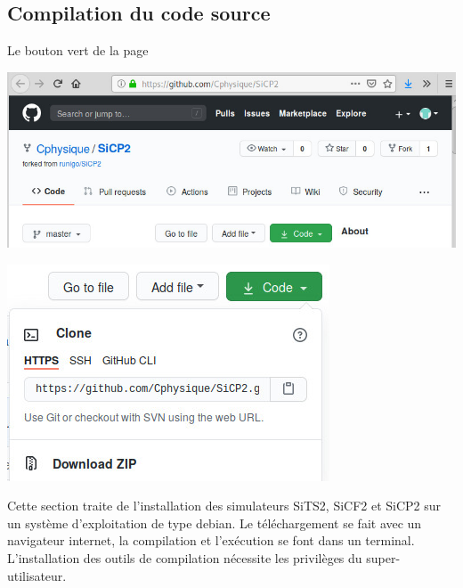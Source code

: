 \subsection{Compilation du code source}
%
Le bouton vert de la page 
%
\begin{center}
\includegraphics[width=.9\textwidth]{./presentation/CphysiqueSiCP2}
\end{center}
%
%
\begin{center}
\includegraphics[width=.9\textwidth]{./presentation/CphysiqueSiCP2code}
\end{center}
%
Cette section traite de l'installation des simulateurs SiTS2, SiCF2 et SiCP2 sur un système d'exploitation de type debian. Le téléchargement se fait avec un navigateur internet, la compilation et l'exécution se font dans un terminal. L'installation des outils de compilation nécessite les privilèges du super-utilisateur.
